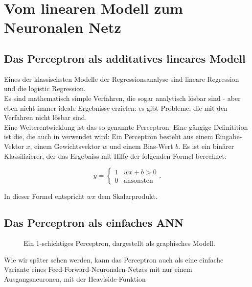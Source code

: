 ﻿\section{Vom linearen Modell zum Neuronalen Netz}

\subsection{Das Perceptron als additatives lineares Modell}
Eines der klassischsten Modelle der Regressionsanalyse sind lineare Regression und die logistic Regression. \\

Es sind mathematisch simple Verfahren, die sogar analytisch lösbar sind - aber eben nicht immer ideale Ergebnisse erzielen: es gibt Probleme, die mit den Verfahren nicht lösbar sind. 
\\

Eine Weiterentwicklung ist das so genannte Perceptron.
Eine gängige Definitition ist die, die auch in \cite{bishop1995neural} verwendet wird: 
Ein Perceptron besteht aus einem Eingabe-Vektor $x$, einem Gewichtsvektor $w$ und einem Bias-Wert $b$. Es ist ein binärer Klassifizierer, der das Ergebniss mit Hilfe der folgenden Formel berechnet:

\begin{equation}
\label{eq:perceptron}
    y = \begin{cases}
               1               & w x + b > 0\\
               0               & \text{ansonsten}
           \end{cases}.
\end{equation}

In dieser Formel entspricht $wx$ dem Skalarprodukt.

\subsection{Das Perceptron als einfaches ANN}

\begin{figure}[ht!]
\label{fig:SLP}
  \centering
    
  \caption{Ein 1-schichtiges Perceptron, dargestellt als graphisches Modell.}
\end{figure}

Wie wir später sehen werden, kann das Perceptron auch als eine einfache Variante eines Feed-Forward-Neuronalen-Netzes mit nur einem Ausgangsneuronen, mit der Heaviside-Funktion


